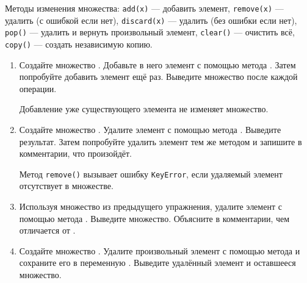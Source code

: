 \documentclass[a4,12pt]{article}
\theoremstyle{remark}
\begin{document}
\begin{exercisecomment}[title={Раздел 2. Основные методы: add, remove, discard, pop, clear}]
Методы изменения множества: \texttt{add(x)} --- добавить элемент,
\texttt{remove(x)} --- удалить (с ошибкой если нет),
\texttt{discard(x)} --- удалить (без ошибки если нет),
\texttt{pop()} --- удалить и вернуть произвольный элемент,
\texttt{clear()} --- очистить всё,
\texttt{copy()} --- создать независимую копию.
\end{exercisecomment}

\begin{enumerate}[resume]

    \item Создайте множество {}. Добавьте в него элемент {} с помощью метода {}. Затем попробуйте добавить элемент {} ещё раз. Выведите множество после каждой операции.

    \begin{exercisecomment}
    Добавление уже существующего элемента не изменяет множество.
    \end{exercisecomment}

    \item Создайте множество {}. Удалите элемент {} с помощью метода {}. Выведите результат. Затем попробуйте удалить элемент {} тем же методом и запишите в комментарии, что произойдёт.

    \begin{exercisenote}
    Метод \texttt{remove()} вызывает ошибку \texttt{KeyError}, если удаляемый элемент отсутствует в множестве.
    \end{exercisenote}

    \item Используя множество {} из предыдущего упражнения, удалите элемент {} с помощью метода {}. Выведите множество. Объясните в комментарии, чем {} отличается от {}.

    \item Создайте множество {}. Удалите произвольный элемент с помощью метода {} и сохраните его в переменную {}. Выведите удалённый элемент и оставшееся множество.


\end{enumerate}
\end{document}
